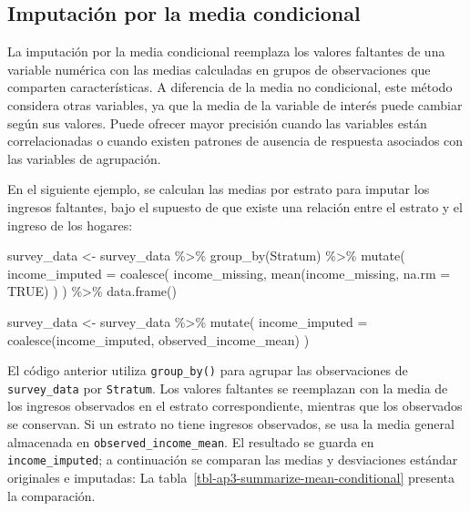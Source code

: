 \documentclass[
  spanish,
  11pt,
  letterpaper,
  oneside,
  open=any]{scrbook}
\newenvironment{Shaded}{\begin{snugshade}}{\end{snugshade}}
\newcommand{\AttributeTok}[1]{\textcolor[rgb]{0.40,0.45,0.13}{#1}}
\newcommand{\ConstantTok}[1]{\textcolor[rgb]{0.56,0.35,0.01}{#1}}
\newcommand{\FunctionTok}[1]{\textcolor[rgb]{0.28,0.35,0.67}{#1}}
\newcommand{\NormalTok}[1]{\textcolor[rgb]{0.00,0.23,0.31}{#1}}
\newcommand{\OtherTok}[1]{\textcolor[rgb]{0.00,0.23,0.31}{#1}}
\newcommand{\SpecialCharTok}[1]{\textcolor[rgb]{0.37,0.37,0.37}{#1}}
\begin{document}
\subsection{Imputación por la media
condicional}\label{imputaciuxf3n-por-la-media-condicional}

La imputación por la media condicional reemplaza los valores faltantes
de una variable numérica con las medias calculadas en grupos de
observaciones que comparten características. A diferencia de la media no
condicional, este método considera otras variables, ya que la media de
la variable de interés puede cambiar según sus valores. Puede ofrecer
mayor precisión cuando las variables están correlacionadas o cuando
existen patrones de ausencia de respuesta asociados con las variables de
agrupación.

En el siguiente ejemplo, se calculan las medias por estrato para imputar
los ingresos faltantes, bajo el supuesto de que existe una relación
entre el estrato y el ingreso de los hogares:

\begin{Shaded}
\begin{Highlighting}[]
\NormalTok{survey\_data }\OtherTok{\textless{}{-}}\NormalTok{ survey\_data }\SpecialCharTok{\%\textgreater{}\%}
  \FunctionTok{group\_by}\NormalTok{(Stratum) }\SpecialCharTok{\%\textgreater{}\%}
  \FunctionTok{mutate}\NormalTok{(}
    \AttributeTok{income\_imputed =} \FunctionTok{coalesce}\NormalTok{(}
\NormalTok{      income\_missing,}
      \FunctionTok{mean}\NormalTok{(income\_missing, }\AttributeTok{na.rm =} \ConstantTok{TRUE}\NormalTok{)}
\NormalTok{    )}
\NormalTok{  ) }\SpecialCharTok{\%\textgreater{}\%}
  \FunctionTok{data.frame}\NormalTok{()}

\NormalTok{survey\_data }\OtherTok{\textless{}{-}}\NormalTok{ survey\_data }\SpecialCharTok{\%\textgreater{}\%}
  \FunctionTok{mutate}\NormalTok{(}
    \AttributeTok{income\_imputed =} \FunctionTok{coalesce}\NormalTok{(income\_imputed, observed\_income\_mean)}
\NormalTok{  )}
\end{Highlighting}
\end{Shaded}

El código anterior utiliza \texttt{group\_by()} para agrupar las
observaciones de \texttt{survey\_data} por \texttt{Stratum}. Los valores
faltantes se reemplazan con la media de los ingresos observados en el
estrato correspondiente, mientras que los observados se conservan. Si un
estrato no tiene ingresos observados, se usa la media general almacenada
en \texttt{observed\_income\_mean}. El resultado se guarda en
\texttt{income\_imputed}; a continuación se comparan las medias y
desviaciones estándar originales e imputadas: La
tabla~\ref{tbl-ap3-summarize-mean-conditional} presenta la comparación.
\end{document}
